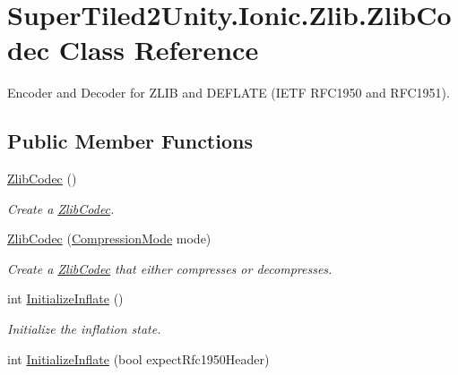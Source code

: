 \hypertarget{class_super_tiled2_unity_1_1_ionic_1_1_zlib_1_1_zlib_codec}{}\section{Super\+Tiled2\+Unity.\+Ionic.\+Zlib.\+Zlib\+Codec Class Reference}
\label{class_super_tiled2_unity_1_1_ionic_1_1_zlib_1_1_zlib_codec}


Encoder and Decoder for Z\+L\+IB and D\+E\+F\+L\+A\+TE (I\+E\+TF R\+F\+C1950 and R\+F\+C1951).  


\subsection*{Public Member Functions}
\begin{DoxyCompactItemize}
\item 
\mbox{\hyperlink{class_super_tiled2_unity_1_1_ionic_1_1_zlib_1_1_zlib_codec_afb741f3d8822709c3fe17ff284d537ab}{Zlib\+Codec}} ()
\begin{DoxyCompactList}\small\item\em Create a \mbox{\hyperlink{class_super_tiled2_unity_1_1_ionic_1_1_zlib_1_1_zlib_codec}{Zlib\+Codec}}. \end{DoxyCompactList}\item 
\mbox{\hyperlink{class_super_tiled2_unity_1_1_ionic_1_1_zlib_1_1_zlib_codec_a447cfe7e7f49e1b5512b7942acb901a4}{Zlib\+Codec}} (\mbox{\hyperlink{namespace_super_tiled2_unity_1_1_ionic_1_1_zlib_ad5b7635d92497e1c905e5de82eb1c6b1}{Compression\+Mode}} mode)
\begin{DoxyCompactList}\small\item\em Create a \mbox{\hyperlink{class_super_tiled2_unity_1_1_ionic_1_1_zlib_1_1_zlib_codec}{Zlib\+Codec}} that either compresses or decompresses. \end{DoxyCompactList}\item 
int \mbox{\hyperlink{class_super_tiled2_unity_1_1_ionic_1_1_zlib_1_1_zlib_codec_aa50e75125aea07774abc7a65b10e1926}{Initialize\+Inflate}} ()
\begin{DoxyCompactList}\small\item\em Initialize the inflation state. \end{DoxyCompactList}\item 
int \mbox{\hyperlink{class_super_tiled2_unity_1_1_ionic_1_1_zlib_1_1_zlib_codec_a2010b019c7053bddd33ef8330281019e}{Initialize\+Inflate}} (bool expect\+Rfc1950\+Header)

\end{DoxyCompactItemize}
